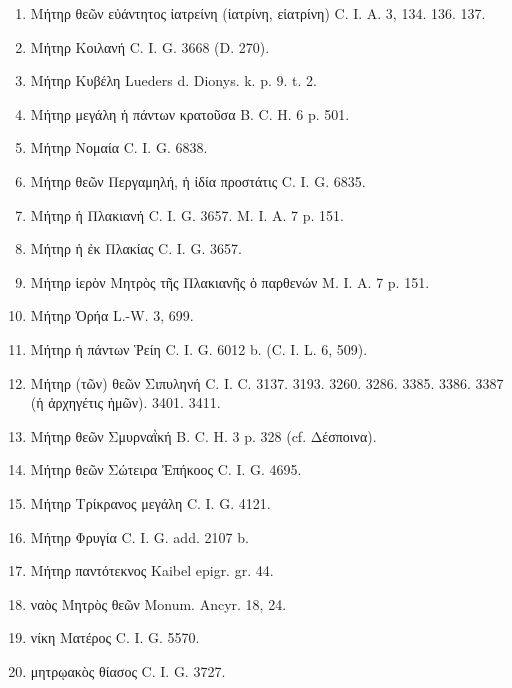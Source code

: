 \documentclass[a4paper, 11pt, oneside, polutonikogreek, german, twocolumn]{article}
\begin{document}
\begin{enumerate}
\item Μήτηρ θεῶν εὐάντητος ἰατρείνη (ἰατρίνη, εἱατρίνη) C. I. A. 3, 134. 136. 137.

\item Μήτηρ Κοιλανή C. I. G. 3668 (D. 270).

\item Μήτηρ Κυβέλη Lueders d. Dionys. k. p. 9. t. 2.

\item Μήτηρ μεγάλη ἡ πάντων κρατοῦσα B. C. H. 6 p. 501.

\item Μήτηρ Νομαία C. I. G. 6838.

\item Μήτηρ θεῶν Περγαμηλή, ἡ ἰδία προστάτις C. I. G. 6835.

\item Μήτηρ ἡ Πλακιανή C. I. G. 3657. M. I. A. 7 p. 151.

\item Μήτηρ ἡ ἐκ Πλακίας C. I. G. 3657.

\item Μήτηρ ἱερὸν Μητρὸς τῆς Πλακιανῆς ὁ παρθενών M. I. A. 7 p. 151.

\item Μήτηρ Ὀρήα L.-W. 3, 699.

\item Μήτηρ ἡ πάντων Ῥείη C. I. G. 6012 b. (C. I. L. 6, 509).

\item Μήτηρ (τῶν) θεῶν Σιπυληνή C. I. C. 3137. 3193. 3260. 3286. 3385. 3386. 3387 (ἡ ἀρχηγέτις ἡμῶν). 3401. 3411.

\item Μήτηρ θεῶν Σμυρναῒκή B. C. H. 3 p. 328 (cf. Δέσποινα).

\item Μήτηρ θεῶν Σώτειρα Ἐπήκοος C. I. G. 4695.

\item Μήτηρ Τρίκρανος μεγάλη C. I. G. 4121.

\item Μήτηρ Φρυγία C. I. G. add. 2107 b.

\item Μήτηρ παντότεκνος Kaibel epigr. gr. 44.

\item ναὸς Μητρὸς θεῶν Monum. Ancyr. 18, 24.

\item νίκη Ματέρος C. I. G. 5570.

\item μητρῳακὸς θίασος C. I. G. 3727.


\end{enumerate}
\end{document}
